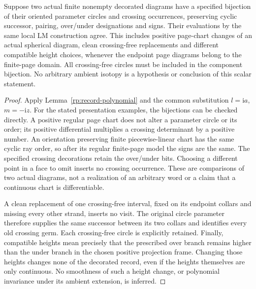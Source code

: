 \begin{lemma}
\label{lc:presentations}
Suppose two actual finite nonempty decorated diagrams have a specified
bijection of their oriented parameter circles and crossing occurrences,
preserving cyclic successor, pairing, over/under designations and signs.
Their evaluations by the same local LM construction agree. This includes
positive page-chart changes of an actual spherical diagram, clean
crossing-free replacements and different compatible height choices,
whenever the endpoint page diagrams belong to the finite-page domain.
All crossing-free circles must be included in the component bijection.
No arbitrary ambient isotopy is a hypothesis or conclusion of this scalar
statement.
\end{lemma}
\begin{proof}
Apply Lemma~\ref{rp:record-polynomial} and the common substitution
$l=\mathrm ia$, $m=-\mathrm iz$. For the stated presentation examples,
the bijections can be checked directly. A positive regular page chart
does not alter a parameter circle or its order; its positive differential
multiplies a crossing determinant by a positive number. An orientation
preserving finite piecewise-linear chart has the same cyclic ray order,
so after its regular finite-page model the signs are the same. The
specified crossing decorations retain the over/under bits. Choosing a
different point in a face to omit inserts no crossing occurrence.
These are comparisons of two actual diagrams, not a realization of an
arbitrary word or a claim that a continuous chart is differentiable.

A clean replacement of one crossing-free interval, fixed on its endpoint
collars and missing every other strand, inserts no visit. The original
circle parameter therefore supplies the same successor between its two
collars and identifies every old crossing germ. Each crossing-free circle
is explicitly retained. Finally, compatible heights mean precisely that
the prescribed over branch remains higher than the under branch in the
chosen positive projection frame. Changing those heights changes none
of the decorated record, even if the heights themselves are only
continuous. No smoothness of such a height change, or polynomial
invariance under its ambient extension, is inferred.
\end{proof}

